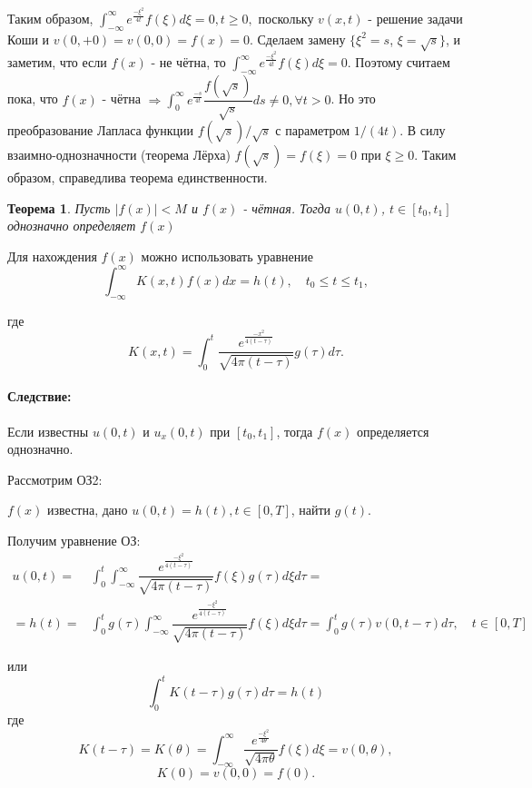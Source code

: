 \documentclass{article}
\newtheorem{theorem}{Теорема}
\newenvironment{hence}{ \paragraph{Следствие:}}{}
\begin{document}
Таким образом, 
$
\int_{-\infty}^{\infty} e^{\frac{-\xi^2}{4t}} f(\xi) d\xi = 0, t \geqslant 0,
$
поскольку $v(x,t)$ - решение задачи Коши и $v(0, +0) = v(0,0) = f(x) = 0$.
Сделаем замену $\{ \xi^2 = s$, $\xi = \sqrt{s} \}$, и заметим, что если $f(x)$ - не чётна, то 
$
\int_{-\infty}^{\infty} e^{\frac{-\xi^2}{4t}} f(\xi) d\xi = 0
$.
Поэтому считаем пока, что $f(x)$ - чётна 
$
\Rightarrow \int_0^{\infty} e^{\frac{-s}{4t}} \dfrac{f(\sqrt{s})}{\sqrt{s}} d s \neq 0, \forall t > 0
$.
Но это преобразование Лапласа функции $f(\sqrt{s}) / \sqrt{s}$ с параметром $1 / (4t)$. В силу взаимно-однозначности (теорема Лёрха) $f(\sqrt{s})  = f(\xi) = 0$ при $\xi \geqslant 0$.
Таким образом, справедлива теорема единственности.

\begin{theorem}
	Пусть $|f(x)| < M$ и $f(x)$ - чётная. Тогда $u(0,t)$, $t \in[t_0,t_1]$ однозначно определяет $f(x)$
\end{theorem}

Для нахождения $f(x)$ можно использовать уравнение 
\begin{equation*}
	\int_{-\infty}^{\infty} K(x,t) f(x) dx = h(t),
	\quad t_0 \leqslant t \leqslant t_1,
\end{equation*}

где 
\begin{equation*}
	K(x,t) = \int_0^t \dfrac{e^{\frac{-x^2}{4 (t-\tau)}}}{\sqrt{4 \pi (t -\tau)}}  g(\tau) d \tau.
\end{equation*}

\begin{hence}
	Если известны $u(0,t)$ и $u_x(0,t)$  при $[t_0,t_1]$, тогда $f(x)$ определяется однозначно.
\end{hence}

Рассмотрим ОЗ2:

$f(x)$ известна, дано $u(0,t) = h(t), t\in [0,T]$,  найти $g(t)$.

Получим уравнение ОЗ:
\begin{align*}
	u(0,t) =& \int_0^t \int_{-\infty}^{\infty} \dfrac{e^{\frac{-\xi^2}{4 (t-\tau)}}}{\sqrt{4 \pi (t -\tau)}} f(\xi) g(\tau) d \xi d \tau = \\
	= h(t) =&
	\int_0^t g(\tau) \int_{-\infty}^{\infty} \dfrac{e^{\frac{-\xi^2}{4 (t-\tau)}}}{\sqrt{4 \pi (t -\tau)}} f(\xi)  d \xi d \tau =
	\int_0^t g(\tau) v(0,t-\tau) d \tau
	, \quad t \in[0,T]
\end{align*}

или
\begin{equation}
	\int_0^t K(t-\tau) g(\tau) d \tau = h(t)
	\label{h(t)}
\end{equation}
где
\begin{equation}
	K(t-\tau	) = K(\theta) = 
	\int_{-\infty}^{\infty} \dfrac{e^{\frac{-\xi^2}{4 \theta}}}{\sqrt{4 \pi \theta}}  f(\xi) d \xi = v(0,\theta),
	\label{K(theta)}
\end{equation}
\begin{equation*}
	K(0) = v(0,0) = f(0).
\end{equation*}
\end{document}
